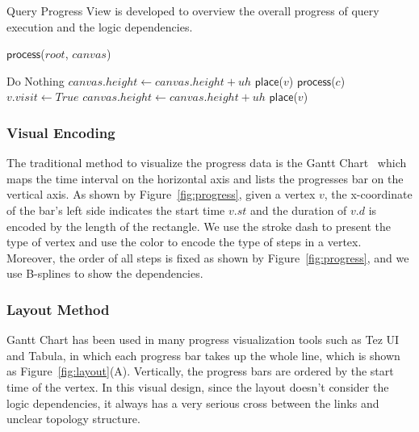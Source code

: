 Query Progress View is developed to overview the overall progress of query execution and the logic dependencies. 

\begin{algorithm}
	\caption{$\mathsf{TDAGLayout}$($R$, $canvas$)}
	\label{alg:TDAGLayout}
	\begin{algorithmic}[1]
		\State$\mathsf{process}$($root$, $canvas$)
		\EndFor
	\end{algorithmic}

\end{algorithm}

\begin{algorithm}
	\caption{$\mathsf{process}$($v$, $canvas$)}
	\label{alg:process}
	\begin{algorithmic}[1]
			\State Do Nothing
		\EndIf
				\State $canvas.height \leftarrow canvas.height + uh$
				\State $\mathsf{place}$($v$)
			\EndIf
		\Else
				\State $\mathsf{process}$($c$)
					\State $v.visit \leftarrow True$
				\EndIf
			\EndFor
				\State $canvas.height \leftarrow canvas.height + uh$
				\State $\mathsf{place}$($v$)
			\EndIf
		\EndIf
	\end{algorithmic}
\end{algorithm}


\subsubsection{Visual Encoding}
The traditional method to visualize the progress data is the Gantt Chart~\cite{clark1922gantt} which maps the time interval on the horizontal axis and lists the progresses bar on the vertical axis.
As shown by Figure~\ref{fig:progress}, given a vertex $v$, the x-coordinate of the bar's left side indicates the start time $v.st$ and the duration of $v.d$ is encoded by the length of the rectangle. We use the stroke dash to present the type of vertex and use the color to encode the type of steps in a vertex. Moreover, the order of all steps is fixed as shown by Figure~\ref{fig:progress}, and we use B-splines to show the dependencies.

\subsubsection{Layout Method}
Gantt Chart has been used in many progress visualization tools such as Tez UI and Tabula, in which each progress bar takes up the whole line, which is shown as Figure~\ref{fig:layout}(A).
Vertically, the progress bars are ordered by the start time of the vertex. In this visual design, since the layout doesn't consider the logic dependencies, it always has a very serious cross between the links and unclear topology structure.

